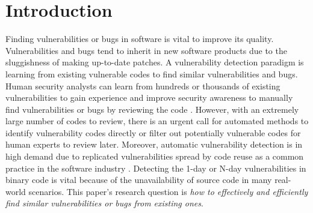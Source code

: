 \section{Introduction}
\label{sec:intro}

Finding vulnerabilities or bugs in software is vital to improve its quality. 
Vulnerabilities and bugs tend to inherit in new software products due to the sluggishness of making up-to-date patches. 
A vulnerability detection paradigm is learning from existing vulnerable codes to find similar vulnerabilities and bugs. 
Human security analysts can learn from hundreds or thousands of existing vulnerabilities to gain experience and improve security awareness to manually find vulnerabilities or bugs by reviewing the code \cite{heffley2004can}. 
However, with an extremely large number of codes to review, there is an urgent call for automated methods to identify vulnerability codes directly or filter out potentially vulnerable codes for human experts to review later. 
Moreover, automatic vulnerability detection is in high demand due to replicated vulnerabilities spread by code reuse as a common practice in the software industry \cite{code_reuse,haefliger2008code}. 
Detecting the 1-day or N-day vulnerabilities in binary code is vital because of the unavailability of source code in many real-world scenarios.
This paper's research question is \textit{how to effectively and efficiently find similar vulnerabilities or bugs from existing ones}. 


